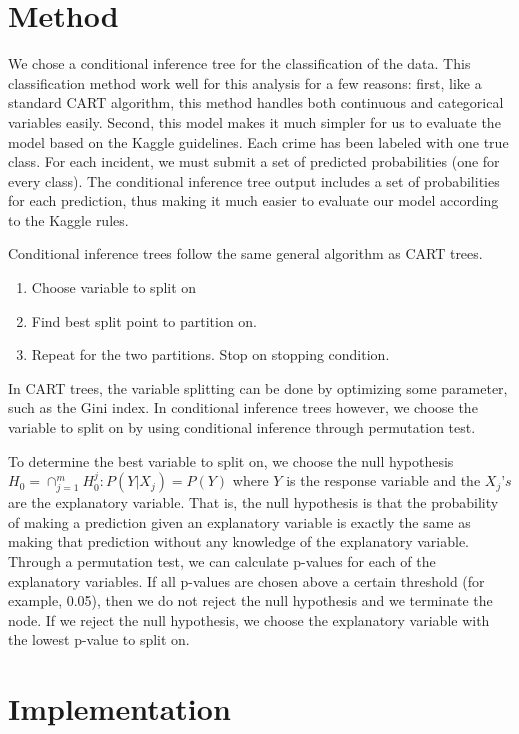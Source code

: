 \documentclass[11pt]{article}
\begin{document}
\section*{Method}

We chose a conditional inference tree for the classification of the data.  This classification method work well for this analysis for a few reasons: first, like a standard CART algorithm, this method handles both continuous and categorical variables easily. Second, this model makes it much simpler for us to evaluate the model based on the Kaggle guidelines. Each crime has been labeled with one true class. For each incident, we must submit a set of predicted probabilities (one for every class). The conditional inference tree output includes a set of probabilities for each prediction, thus making it much easier to evaluate our model according to the Kaggle rules. 
 
Conditional inference trees follow the same general algorithm as CART trees. 

\begin{enumerate}
\item Choose variable to split on
\item Find best split point to partition on.
\item Repeat for the two partitions. Stop on stopping condition. 
\end{enumerate}

In CART trees, the variable splitting can be done by optimizing some parameter, such as the Gini index. In conditional inference trees however, we choose the variable to split on by using conditional inference through permutation test.

To determine the best variable to split on, we choose the null hypothesis  $H_0 = \cap_{j=1}^{m}  H_0^j : P(Y|X_j) = P(Y)$ where $Y$ is the response variable and the $X_j’s$ are the explanatory variable. That is, the null hypothesis is that the probability of making a prediction given an explanatory variable is exactly the same as making that prediction without any knowledge of the explanatory variable.  Through a permutation test, we can calculate p-values for each of the explanatory variables. If all p-values are chosen above a certain threshold (for example, 0.05), then we do not reject the null hypothesis and we terminate the node.  If  we reject the null hypothesis, we choose the explanatory variable with the lowest p-value to split on. 
 

 
\section*{Implementation}
\end{document}

